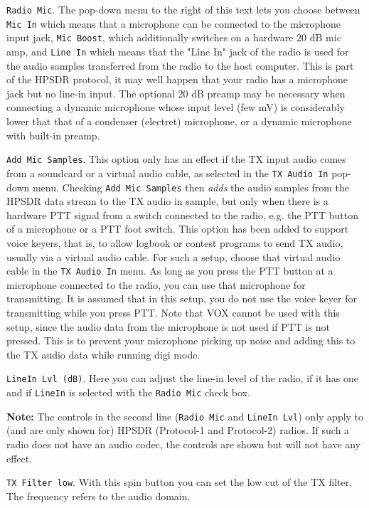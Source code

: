 \documentclass[12pt]{book}
\def\rett#1{\texttt{\color{red}#1}}
\begin{document}
\rett{Radio Mic}. The pop-down menu to the right of this text
lets you choose between \rett{Mic In} which means
that a microphone can be connected to the microphone input jack, \rett{Mic Boost}, which
additionally switches on a hardware 20 dB mic amp, and \rett{Line In} which means that the
"Line In" jack of the radio is used for the audio samples transferred from the radio to the
host computer. This is part of the HPSDR protocol, it may well happen that your radio has a
microphone jack but no line-in input. The optional 20 dB preamp may be necessary when connecting
a dynamic microphone whose input level (few mV) is considerably lower that that of a
condenser (electret) microphone, or a dynamic microphone with built-in preamp.

\rett{Add Mic Samples}. This option only has an effect if the TX input audio comes from a
soundcard or a virtual audio cable, as selected in the \rett{TX Audio In} pop-down menu.
Checking \rett{Add Mic Samples} then \textit{adds} the audio samples from the HPSDR data
stream to the TX audio in sample, but only when there is a hardware PTT signal from a
switch connected to the radio, e.g. the PTT button of a microphone or a PTT foot switch.
This option has been added to support voice keyers, that is, to allow logbook or contest
programs to send TX audio, usually via a virtual audio cable. For such a setup, choose that virtual
audio cable in the \rett{TX Audio In} menu. As long as you press the PTT button at
a microphone connected to the radio, you can use that microphone for transmitting. It is
assumed that in this setup, you do not use the voice keyer for transmitting while you press PTT.
Note that VOX cannot be used with this setup, since the audio data from the microphone is not
used if PTT is not pressed. This is to prevent your microphone picking up noise and adding
this to the TX audio data while running digi mode.

\rett{LineIn Lvl (dB)}. Here you can adjust the line-in level of the radio, if it
has one and if \rett{LineIn} is selected with the \rett{Radio Mic} check box.

\textbf{Note:} The controls in the second line (\rett{Radio Mic} and \rett{LineIn Lvl}) only
apply to (and are only
shown for) HPSDR (Protocol-1 and Protocol-2) radios. If such a radio does not have an audio codec,
the controls are shown but will not have any effect.

\rett{TX Filter low}. With this spin button you can set the low cut of the TX filter. The
frequency refers to the audio domain.
\end{document}

